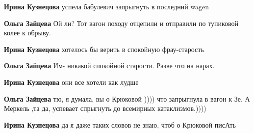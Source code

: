 \begin{itemize}
\begin{itemize}
\textbf{Ирина Кузнецова} успела бабулевич запрыгнуть в последний wagen

 
\textbf{Ольга Зайцева} Ой ли? Тот вагон походу отцепили и отправили по тупиковой колее к обрыву.

 
\textbf{Ирина Кузнецова} хотелось бы верить в спокойную фрау-старость 👵🏼

 
\textbf{Ольга Зайцева} Им- никакой спокойной старости. Разве что на нарах.

 
\textbf{Ирина Кузнецова} они все хотели как лудше👹

 
\textbf{Ольга Зайцева} тю, я думала, вы о Крюковой )))) что запрыгнула в вагон к Зе. А Меркель ,та да, успевает спрыгнуть до всемирных катаклизмов.))))

 
\textbf{Ирина Кузнецова} да я даже таких словов не знаю, чтоб о Крюковой писАть🤣🤝

 

\end{itemize}
\end{itemize}
